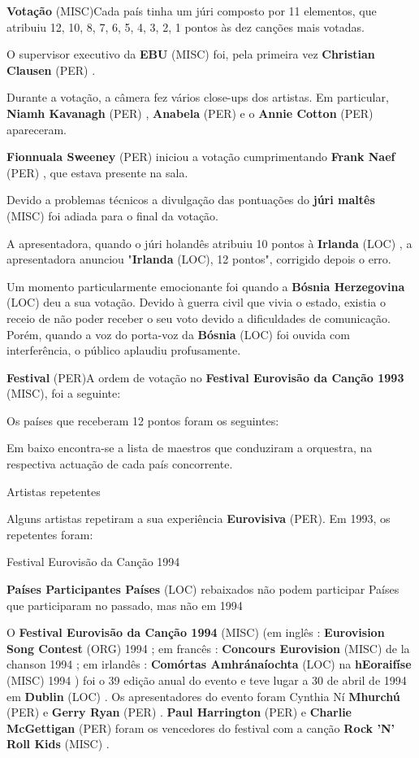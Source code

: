 \documentclass[12pt,a4paper]{article}
\begin{document}
\textbf{Votação} (MISC)Cada país tinha um júri composto por 11 elementos, que atribuiu 12, 10, 8, 7, 6, 5, 4, 3, 2, 1 pontos às dez canções mais votadas.

O supervisor executivo da \textbf{EBU} (MISC) foi, pela primeira vez \textbf{Christian Clausen} (PER) .

Durante a votação, a câmera fez vários close-ups dos artistas. Em particular, \textbf{Niamh Kavanagh} (PER) , \textbf{Anabela} (PER) e o \textbf{Annie Cotton} (PER) apareceram.

\textbf{Fionnuala Sweeney} (PER) iniciou a votação cumprimentando \textbf{Frank Naef} (PER) , que estava presente na sala.

Devido a problemas técnicos a divulgação das pontuações do \textbf{júri maltês} (MISC) foi adiada para o final da votação.

A apresentadora, quando o júri holandês atribuiu 10 pontos à \textbf{Irlanda} (LOC) , a apresentadora anunciou "\textbf{Irlanda} (LOC), 12 pontos", corrigido depois o erro.

Um momento particularmente emocionante foi quando a \textbf{Bósnia Herzegovina} (LOC) deu a sua votação. Devido à guerra civil que vivia o estado, existia o receio de não poder receber o seu voto devido a dificuldades de comunicação. Porém, quando a voz do porta-voz da \textbf{Bósnia} (LOC) foi ouvida com interferência, o público aplaudiu profusamente.



\textbf{Festival} (PER)A ordem de votação no \textbf{Festival Eurovisão da Canção 1993} (MISC), foi a seguinte:

Os países que receberam 12 pontos foram os seguintes:

Em baixo encontra-se a lista de maestros que conduziram a orquestra, na respectiva actuação de cada país concorrente.



Artistas repetentes

Alguns artistas repetiram a sua experiência \textbf{Eurovisiva} (PER). Em 1993, os repetentes foram:



Festival Eurovisão da Canção 1994



\textbf{Países Participantes Países} (LOC) rebaixados não podem participar Países que participaram no passado, mas não em 1994

O \textbf{Festival Eurovisão da Canção 1994} (MISC) (em inglês : \textbf{Eurovision Song Contest} (ORG) 1994 ; em francês : \textbf{Concours Eurovision} (MISC) de la chanson 1994 ; em irlandês : \textbf{Comórtas Amhránaíochta} (LOC) na \textbf{hEoraifíse} (MISC) 1994 ) foi o 39 edição anual do evento e teve lugar a 30 de abril de 1994 em \textbf{Dublin} (LOC) . Os apresentadores do evento foram Cynthia Ní \textbf{Mhurchú} (PER) e \textbf{Gerry Ryan} (PER) . \textbf{Paul Harrington} (PER) e \textbf{Charlie McGettigan} (PER) foram os vencedores do festival com a canção \textbf{Rock 'N' Roll Kids} (MISC) .
\end{document}
